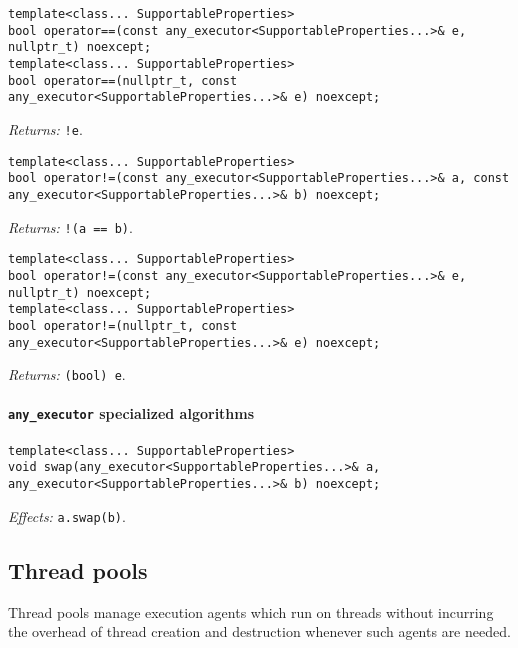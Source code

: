\documentclass[a4paper,12pt,notitlepage,twoside,openright]{article}
\begin{document}
\begin{verbatim}
template<class... SupportableProperties>
bool operator==(const any_executor<SupportableProperties...>& e, nullptr_t) noexcept;
template<class... SupportableProperties>
bool operator==(nullptr_t, const any_executor<SupportableProperties...>& e) noexcept;
\end{verbatim}

\emph{Returns:} \texttt{!e}.

\begin{verbatim}
template<class... SupportableProperties>
bool operator!=(const any_executor<SupportableProperties...>& a, const any_executor<SupportableProperties...>& b) noexcept;
\end{verbatim}

\emph{Returns:} \texttt{!(a == b)}.

\begin{verbatim}
template<class... SupportableProperties>
bool operator!=(const any_executor<SupportableProperties...>& e, nullptr_t) noexcept;
template<class... SupportableProperties>
bool operator!=(nullptr_t, const any_executor<SupportableProperties...>& e) noexcept;
\end{verbatim}

\emph{Returns:} \texttt{(bool) e}.

\hypertarget{any_executor-specialized-algorithms}{%
\paragraph{\texorpdfstring{\texttt{any_executor} specialized
algorithms}{ specialized algorithms}}\label{any_executor-specialized-algorithms}}

\begin{verbatim}
template<class... SupportableProperties>
void swap(any_executor<SupportableProperties...>& a, any_executor<SupportableProperties...>& b) noexcept;
\end{verbatim}

\emph{Effects:} \texttt{a.swap(b)}.

\hypertarget{thread-pools}{%
\subsection{Thread pools}\label{thread-pools}}

Thread pools manage execution agents which run on threads without
incurring the overhead of thread creation and destruction whenever such
agents are needed.
\end{document}
